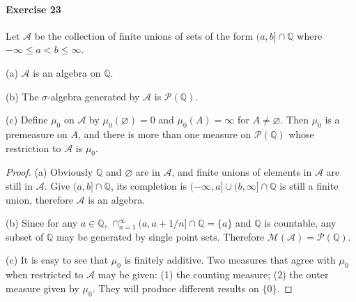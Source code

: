 \paragraph{Exercise 23}
Let $\mathcal{A}$ be the collection of finite unions of sets of the form $(a,b]\cap\mathbb{Q}$ where $-\infty\le a<b\le\infty$.
\par(a) $\mathcal{A}$ is an algebra on $\mathbb{Q}$.
\par(b) The $\sigma$-algebra generated by $\mathcal{A}$ is $\mathcal{P}(\mathbb{Q})$.
\par(c) Define $\mu_0$ on $\mathcal{A}$ by $\mu_0(\varnothing)=0$ and $\mu_0(A)=\infty$ for $A\neq\varnothing$. Then $\mu_0$ is a premeasure on $A$, and there is more than one measure on $\mathcal{P}(\mathbb{Q})$ whose restriction to $\mathcal{A}$ is $\mu_0$.
\begin{proof}
    (a) Obviously $\mathbb{Q}$ and $\varnothing$ are in $\mathcal{A}$, and finite unions of elements in $\mathcal{A}$ are still in $\mathcal{A}$. Give $(a,b]\cap\mathbb{Q}$, its completion is $(-\infty,a]\cup(b,\infty]\cap\mathbb{Q}$ is still a finite union, therefore $\mathcal{A}$ is an algebra.
    \par (b) Since for any $a\in\mathbb{Q}$, $\cap_{n=1}^{\infty}(a,a+1/n]\cap\mathbb{Q}=\{a\}$ and $\mathbb{Q}$ is countable, any subset of $\mathbb{Q}$ may be generated by single point sets. Therefore $\mathcal{M}(\mathcal{A})=\mathcal{P}(\mathbb{Q})$.
    \par (c) It is easy to see that $\mu_0$ is finitely additive. Two measures that agree with $\mu_0$ when restricted to $\mathcal{A}$ may be given: (1) the counting measure; (2) the outer measure given by $\mu_0$. They will produce different results on $\{0\}$.
\end{proof}
